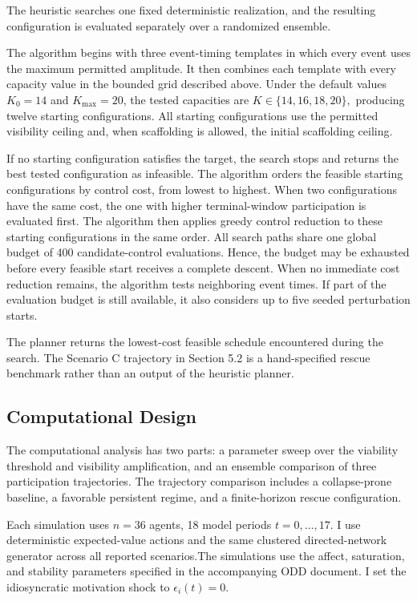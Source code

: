 \documentclass[11pt]{article}
\begin{document}
The heuristic searches one fixed deterministic realization, and the resulting configuration is evaluated separately over a randomized ensemble.

The algorithm begins with three event-timing templates in which every event uses the maximum permitted amplitude. It then combines each template with every capacity value in the bounded grid described above. Under the default values $K_0=14$ and $K_{\max}=20$, the tested capacities are
$K\in\{14,16,18,20\},$
producing twelve starting configurations. All starting configurations use the permitted visibility ceiling and, when scaffolding is allowed, the initial scaffolding ceiling.

If no starting configuration satisfies the target, the search stops and returns the best tested configuration as infeasible. The algorithm orders the feasible starting configurations by control cost, from lowest to highest. When two configurations have the same cost, the one with higher terminal-window participation is evaluated first. The algorithm then applies greedy control reduction to these starting configurations in the same order. All search paths share one global budget of 400 candidate-control evaluations. Hence, the budget may be exhausted before every feasible start receives a complete descent. When no immediate cost reduction remains, the algorithm tests neighboring event times. If part of the evaluation budget is still available, it also considers up to five seeded perturbation starts.

The planner returns the lowest-cost feasible schedule encountered during the search. The Scenario C trajectory in Section 5.2 is a hand-specified rescue benchmark rather than an output of the heuristic planner.

\subsection{Computational Design}
The computational analysis has two parts: a parameter sweep over the viability threshold and visibility amplification, and an ensemble comparison of three participation trajectories. The trajectory comparison includes a collapse-prone baseline, a favorable persistent regime, and a finite-horizon rescue configuration. 

Each simulation uses $n=36$ agents, 18 model periods $t=0, \ldots, 17$. I use deterministic expected-value actions and the same clustered directed-network generator across all reported scenarios.The simulations use the affect, saturation, and stability parameters specified in the accompanying ODD document. I set the idiosyncratic motivation shock to $\epsilon_i(t)=0$.
\end{document}
